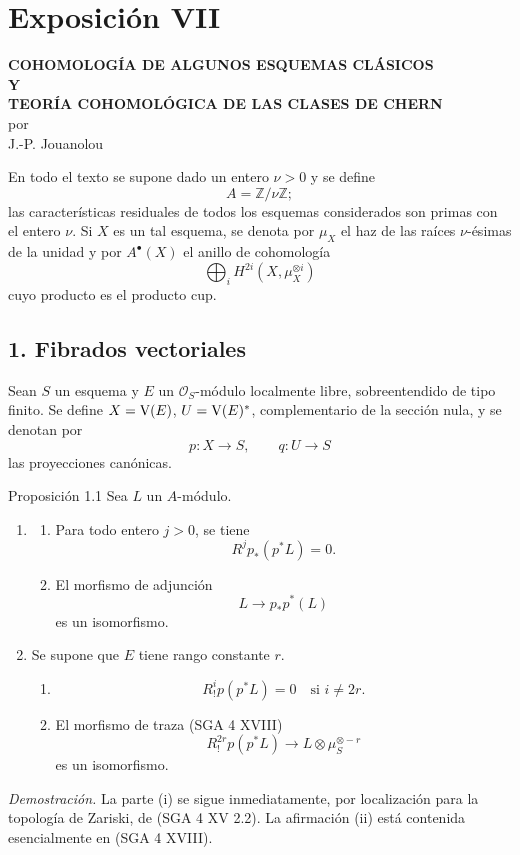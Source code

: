 \section*{Exposición VII}

\begin{center}
\textbf{COHOMOLOGÍA DE ALGUNOS ESQUEMAS CLÁSICOS}\\[0.5em]
\textbf{Y}\\[0.5em]
\textbf{TEORÍA COHOMOLÓGICA DE LAS CLASES DE CHERN}\\[1em]
por\\[0.5em]
J.-P. Jouanolou
\end{center}

En todo el texto se supone dado un entero $\nu>0$ y se define
\[
A=\mathbb Z/\nu\mathbb Z;
\]
las características residuales de todos los esquemas considerados son primas con el entero $\nu$. Si $X$ es un tal esquema, se denota por $\mu_X$ el haz de las raíces $\nu$-ésimas de la unidad y por $A^{\bullet}(X)$ el anillo de cohomología
\[
\bigoplus_i H^{2i}(X,\mu_X^{\otimes i})
\]
cuyo producto es el producto cup.

\subsection*{1. Fibrados vectoriales}

Sean $S$ un esquema y $E$ un $\mathcal O_S$-módulo localmente libre, sobreentendido de tipo finito. Se define $X=\mathrm V(E)$, $U=\mathrm V(E)^*$, complementario de la sección nula, y se denotan por
\[
p:X\to S,
\qquad
q:U\to S
\]
las proyecciones canónicas.

\begin{statement}{Proposición 1.1}
Sea $L$ un $A$-módulo.
\begin{enumerate}[label=(\roman*)]
\item
\begin{enumerate}[label=\alph*)]
\item Para todo entero $j>0$, se tiene
\[
R^j p_*(p^*L)=0.
\]
\item El morfismo de adjunción
\[
L\longrightarrow p_*p^*(L)
\]
es un isomorfismo.
\end{enumerate}
\item Se supone que $E$ tiene rango constante $r$.
\begin{enumerate}[label=\alph*)]
\item
\[
R_!^i p(p^*L)=0\quad\text{si }i\ne 2r.
\]
\item El morfismo de traza (SGA 4 XVIII)
\[
R_!^{2r}p(p^*L)\longrightarrow L\otimes\mu_S^{\otimes -r}
\]
es un isomorfismo.
\end{enumerate}
\end{enumerate}
\end{statement}

\emph{Demostración.} La parte (i) se sigue inmediatamente, por localización para la topología de Zariski, de (SGA 4 XV 2.2). La afirmación (ii) está contenida esencialmente en (SGA 4 XVIII).
